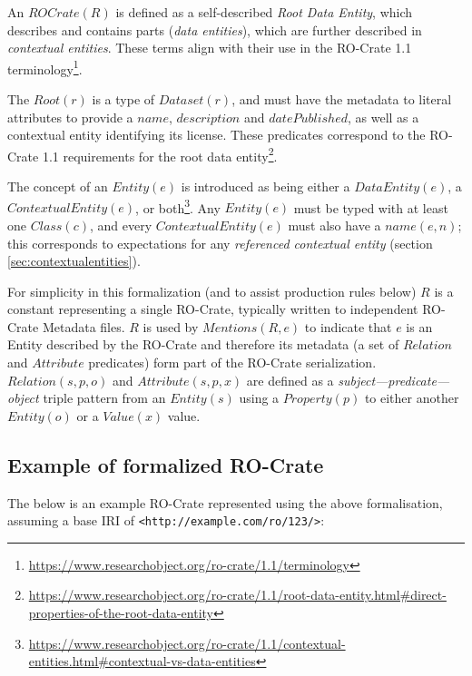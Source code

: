 An $ROCrate(R)$ is defined as a self-described \emph{Root Data Entity}, which describes and contains parts (\emph{data entities}), which are further described in \emph{contextual entities}.  These terms align with their use in the RO-Crate 1.1 terminology\footnote{
    \url{https://www.researchobject.org/ro-crate/1.1/terminology}}.

The $Root(r)$ is a type of $Dataset(r)$, and must have the metadata to literal attributes to provide a $name$, $description$ and $datePublished$, as well as a contextual entity identifying its license. These predicates correspond to the RO-Crate 1.1 requirements for the root data entity\footnote{
    \url{https://www.researchobject.org/ro-crate/1.1/root-data-entity.html\#direct-properties-of-the-root-data-entity}
}.

The concept of an $Entity(e)$ is introduced as being either a $DataEntity(e)$, a $ContextualEntity(e)$, or both\footnote{
    \url{https://www.researchobject.org/ro-crate/1.1/contextual-entities.html\#contextual-vs-data-entities}
}. Any $Entity(e)$ must be typed with at least one $Class(c)$, and every $ContextualEntity(e)$ must also have a $name(e,n)$; this corresponds to expectations for any \emph{referenced contextual entity} (section \ref{sec:contextualentities}). 

For simplicity in this formalization (and to assist production rules below) $R$ is a constant representing a single RO-Crate, typically written to independent RO-Crate Metadata files. $R$ is used by $Mentions(R, e)$ to indicate that $e$ is an Entity described by the RO-Crate and therefore its metadata (a set of $Relation$ and $Attribute$ predicates) form part of the RO-Crate serialization. $Relation(s, p, o)$ and $Attribute(s, p, x)$ are defined as a \emph{subject—predicate—object} triple pattern from an $Entity(s)$ using a $Property(p)$ to either another $Entity(o)$ or a $Value(x)$ value.

\subsection{Example of formalized RO-Crate}

The below is an example RO-Crate represented using the above formalisation, assuming a base IRI of \texttt{<http://example.com/ro/123/>}:

